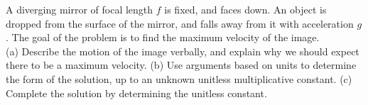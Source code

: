 A diverging mirror of focal length $f$ is fixed, and faces down.
An object is dropped from the surface of the mirror, and falls away
from it with acceleration $g$. The goal of the problem is to find
the maximum velocity of the image.\\
(a) Describe the motion of the image verbally, and explain why we should
expect there to be a maximum velocity.\hwendpart
(b) Use arguments based on units to determine the form of the solution,
up to an unknown unitless multiplicative constant.\hwendpart
(c) Complete the solution by determining the unitless constant.
